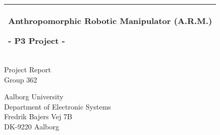 
%
\begin{titlepage}
  \addtolength{\hoffset}{0.5\evensidemargin-0.5\oddsidemargin} %
  \noindent%
  \begin{tabular}{@{}p{\textwidth}@{}}
    \toprule[2pt]
    \midrule
    \vspace{0.2cm}
    \begin{center}
    \Huge{\textbf{
      Anthropomorphic Robotic Manipulator (A.R.M.)
    }}
    \end{center}
    \begin{center}
      \Large{
        - P3 Project -%
      }
    \end{center}
    \vspace{0.2cm}\\
    \midrule
    \toprule[2pt]
  \end{tabular}
  \vspace{0.1 cm}
  
  \begin{center}
   {\large
      Project Report%
    }\\
    \vspace{0.2cm}
    {\Large
      Group 362\\%
      \vspace{0.8 cm}
    }

  \end{center}
  \vfill
  \begin{center}
  Aalborg University\\
  Department of Electronic Systems\\
  Fredrik Bajers Vej 7B\\
  DK-9220 Aalborg\\
  \end{center}
\end{titlepage}
\clearpage
